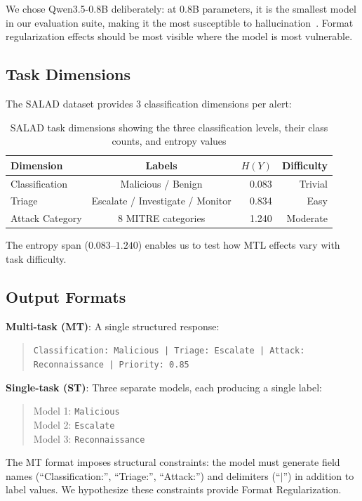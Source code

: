 \documentclass[review,3p]{elsarticle}
\begin{document}
We chose Qwen3.5-0.8B deliberately: at 0.8B parameters, it is the smallest model in our evaluation suite, making it the most susceptible to hallucination~\cite{p21}. Format regularization effects should be most visible where the model is most vulnerable.

\subsection{Task Dimensions}
The SALAD dataset provides 3 classification dimensions per alert:

\begin{table}[!ht]
\centering
\caption{SALAD task dimensions showing the three classification levels, their class counts, and entropy values}
\label{tab:dims}
\begin{tabular}{lcrr}
\toprule
\textbf{Dimension} & \textbf{Labels} & $H(Y)$ & \textbf{Difficulty} \\
\midrule
Classification & Malicious / Benign & 0.083 & Trivial \\
Triage & Escalate / Investigate / Monitor & 0.834 & Easy \\
Attack Category & 8 MITRE categories & 1.240 & Moderate \\
\bottomrule
\end{tabular}
\end{table}

The entropy span ($0.083$--$1.240$) enables us to test how MTL effects vary with task difficulty.

\subsection{Output Formats}

\textbf{Multi-task (MT)}: A single structured response:
\begin{quote}\small
\texttt{Classification: Malicious | Triage: Escalate | Attack: Reconnaissance | Priority: 0.85}
\end{quote}

\textbf{Single-task (ST)}: Three separate models, each producing a single label:
\begin{quote}\small
Model 1: \texttt{Malicious} \\
Model 2: \texttt{Escalate} \\
Model 3: \texttt{Reconnaissance}
\end{quote}

The MT format imposes structural constraints: the model must generate field names (``Classification:'', ``Triage:'', ``Attack:'') and delimiters (``$|$'') in addition to label values. We hypothesize these constraints provide Format Regularization.
\end{document}
